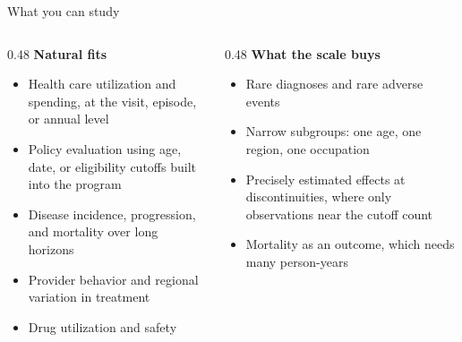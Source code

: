 \documentclass[aspectratio=169,11pt]{beamer}
\begin{document}
\begin{frame}{What you can study}
  \begin{columns}[T]
    \begin{column}{0.48\textwidth}
      \textbf{\color{kdgreen}Natural fits}
      \begin{itemize}\small
        \setlength{\itemsep}{6pt}
        \item Health care utilization and spending, at the visit, episode, or
              annual level
        \item Policy evaluation using age, date, or eligibility cutoffs built
              into the program
        \item Disease incidence, progression, and mortality over long horizons
        \item Provider behavior and regional variation in treatment
        \item Drug utilization and safety
      \end{itemize}
    \end{column}
    \begin{column}{0.48\textwidth}
      \textbf{\color{kdaccent}What the scale buys}
      \begin{itemize}\small
        \setlength{\itemsep}{6pt}
        \item Rare diagnoses and rare adverse events
        \item Narrow subgroups: one age, one region, one occupation
        \item Precisely estimated effects at discontinuities, where only
              observations near the cutoff count
        \item Mortality as an outcome, which needs many person-years
      \end{itemize}
    \end{column}
  \end{columns}
\end{frame}
\end{document}

